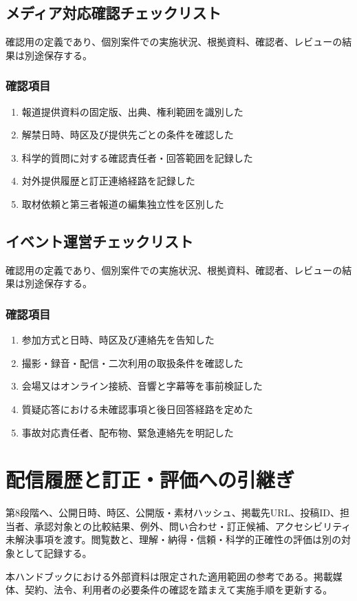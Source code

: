 \documentclass[a4paper,11pt]{article}
\begin{document}
\subsection{メディア対応確認チェックリスト}
\par 確認用の定義であり、個別案件での実施状況、根拠資料、確認者、レビューの結果は別途保存する。\par\medskip
\subsubsection*{確認項目}
\begin{enumerate}[leftmargin=2em,itemsep=0.3em]
\item 報道提供資料の固定版、出典、権利範囲を識別した\par
\item 解禁日時、時区及び提供先ごとの条件を確認した\par
\item 科学的質問に対する確認責任者・回答範囲を記録した\par
\item 対外提供履歴と訂正連絡経路を記録した\par
\item 取材依頼と第三者報道の編集独立性を区別した\par
\end{enumerate}
\subsection{イベント運営チェックリスト}
\par 確認用の定義であり、個別案件での実施状況、根拠資料、確認者、レビューの結果は別途保存する。\par\medskip
\subsubsection*{確認項目}
\begin{enumerate}[leftmargin=2em,itemsep=0.3em]
\item 参加方式と日時、時区及び連絡先を告知した\par
\item 撮影・録音・配信・二次利用の取扱条件を確認した\par
\item 会場又はオンライン接続、音響と字幕等を事前検証した\par
\item 質疑応答における未確認事項と後日回答経路を定めた\par
\item 事故対応責任者、配布物、緊急連絡先を明記した\par
\end{enumerate}
\section{配信履歴と訂正・評価への引継ぎ}
\par 第8段階へ、公開日時、時区、公開版・素材ハッシュ、掲載先URL、投稿ID、担当者、承認対象との比較結果、例外、問い合わせ・訂正候補、アクセシビリティ未解決事項を渡す。閲覧数と、理解・納得・信頼・科学的正確性の評価は別の対象として記録する。\par\medskip
\par 本ハンドブックにおける外部資料は限定された適用範囲の参考である。掲載媒体、契約、法令、利用者の必要条件の確認を踏まえて実施手順を更新する。\par\medskip
\end{document}
